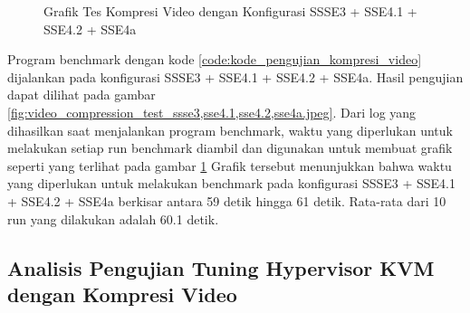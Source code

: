 \begin{figure}
    \centering
    \caption{Grafik Tes Kompresi Video dengan Konfigurasi SSSE3 + SSE4.1 + SSE4.2 + SSE4a}
    \label{fig:video_compression_test_ssse3,sse4.1,sse4.2,sse4a_graph}
\end{figure}

Program benchmark dengan kode \ref{code:kode_pengujian_kompresi_video} dijalankan pada konfigurasi SSSE3 + SSE4.1 + SSE4.2 + SSE4a. Hasil pengujian dapat dilihat pada gambar \ref{fig:video_compression_test_ssse3,sse4.1,sse4.2,sse4a.jpeg}. Dari log yang dihasilkan saat menjalankan program benchmark, waktu yang diperlukan untuk melakukan setiap run benchmark diambil dan digunakan untuk membuat grafik seperti yang terlihat pada gambar \ref{fig:video_compression_test_ssse3,sse4.1,sse4.2,sse4a_graph} Grafik tersebut menunjukkan bahwa waktu yang diperlukan untuk melakukan benchmark pada konfigurasi SSSE3 + SSE4.1 + SSE4.2 + SSE4a berkisar antara 59 detik hingga 61 detik. Rata-rata dari 10 run yang dilakukan adalah 60.1 detik.

\subsection{Analisis Pengujian Tuning Hypervisor KVM dengan Kompresi Video}

